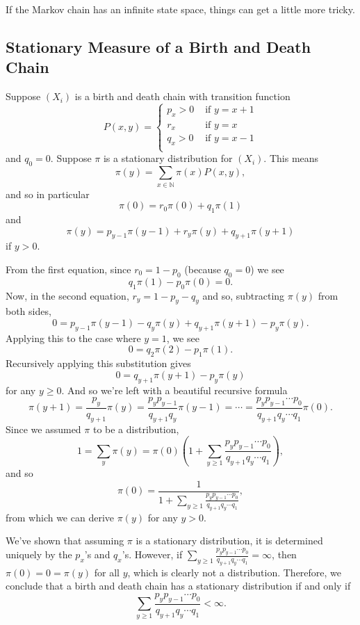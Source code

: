 \documentclass{problemset}
\newcommand{\N}{\mathbb{N}}
\newcommand{\1}{\mathbf{1}}
\begin{document}
	If the Markov chain has an infinite state space, things can get a little more tricky.

	\subsection*{Stationary Measure of a Birth and Death Chain}

	Suppose $(X_i)$ is a birth and death chain with transition function
	\[
		P(x,y)=\begin{cases} 
			p_x>0 &\text{ if }y=x+1\\
			r_x &\text{ if }y=x\\
			q_x>0 &\text{ if }y=x-1\\
		\end{cases}
	\]
	and $q_0=0$.  Suppose $\pi$ is a stationary distribution for $(X_i)$.  This means
	\[
		\pi(y) = \sum_{x\in\N} \pi(x)P(x,y),
	\]
	and so in particular
	\[
		\pi(0)=r_0\pi(0) + q_1\pi(1)
	\]
	and 
	\[
		\pi(y) = p_{y-1}\pi(y-1)+r_y\pi(y)+q_{y+1}\pi(y+1)
	\]
	if $y>0$.

	From the first equation, since $r_0=1-p_0$ (because $q_0=0$) we see
	\[
		q_1\pi(1)-p_0\pi(0)=0.
	\]
	Now, in the second equation, $r_y=1-p_y-q_y$ and so, subtracting $\pi(y)$ from both
	sides,
	\[
		0=p_{y-1}\pi(y-1) - q_y\pi(y) + q_{y+1}\pi(y+1)-p_y\pi(y).
	\]
	Applying this to the case where $y=1$, we see
	\[
		0=q_2\pi(2)-p_1\pi(1).
	\]
	Recursively applying this substitution gives
	\[
		0=q_{y+1}\pi(y+1)-p_y\pi(y)
	\]
	for any $y\geq 0$.  And so we're left with a beautiful recursive formula
	\[
		\pi(y+1) = \frac{p_y}{q_{y+1}}\pi(y) = \frac{p_yp_{y-1}}{q_{y+1}q_{y}}\pi(y-1)=\cdots
		=\frac{p_yp_{y-1}\cdots p_0}{q_{y+1}q_{y}\cdots q_1}\pi(0).
	\]
	Since we assumed $\pi$ to be a distribution, 
	\[
		1=\sum_y \pi(y) = \pi(0)\left(1+\sum_{y\geq 1} \frac{p_yp_{y-1}\cdots p_0}{q_{y+1}q_{y}\cdots q_1}\right),
	\]
	and so
	\[
		\pi(0) = \frac{1}{1+\sum_{y\geq 1} \frac{p_yp_{y-1}\cdots p_0}{q_{y+1}q_{y}\cdots q_1}},
	\]
	from which we can derive $\pi(y)$ for any $y>0$.

	We've shown that assuming $\pi$ is a stationary distribution, it is determined uniquely
	by the $p_x$'s and $q_x$'s.  However, if $\sum_{y\geq 1} \frac{p_yp_{y-1}\cdots p_0}{q_{y+1}q_{y}\cdots q_1}=\infty$,
	then $\pi(0)=0=\pi(y)$ for all $y$, which is clearly not a distribution.
	Therefore, we conclude that a birth and death chain has a stationary distribution if and only if
	\[
		\sum_{y\geq 1} \frac{p_yp_{y-1}\cdots p_0}{q_{y+1}q_{y}\cdots q_1} < \infty.
	\]
	
\end{document}
